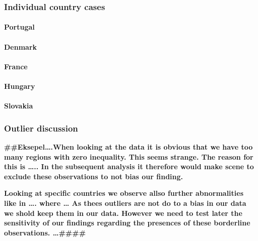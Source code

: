 \documentclass[
  a4paper,
  DIV=11,
  numbers=noendperiod]{scrartcl}
\let\oldparagraph\paragraph
\renewcommand{\paragraph}[1]{\oldparagraph{#1}\mbox{}}
\begin{document}
\hypertarget{individual-country-cases}{%
\subsubsection{Individual country
cases}\label{individual-country-cases}}

\hypertarget{portugal-1}{%
\paragraph{Portugal}\label{portugal-1}}

\hypertarget{denmark-1}{%
\paragraph{Denmark}\label{denmark-1}}

\hypertarget{france-1}{%
\paragraph{France}\label{france-1}}

\hypertarget{hungary-1}{%
\paragraph{Hungary}\label{hungary-1}}

\hypertarget{slovakia-1}{%
\paragraph{Slovakia}\label{slovakia-1}}

\hypertarget{outlier-discussion}{%
\subsubsection{\texorpdfstring{\textbf{Outlier
discussion}}{Outlier discussion}}\label{outlier-discussion}}

\textbf{\#\#Eksepel\ldots.When looking at the data it is obvious that we
have too many regions with zero inequality. This seems strange. The
reason for this is \ldots.. In the subsequent analysis it therefore
would make scene to exclude these observations to not bias our finding.}

\textbf{Looking at specific countries we observe allso further
abnormalities like in \ldots. where \ldots{} As thees outliers are not
do to a bias in our data we shold keep them in our data. However we need
to test later the sensitivity of our findings regarding the presences of
these borderline observations. \ldots\#\#\#\#}
\end{document}
